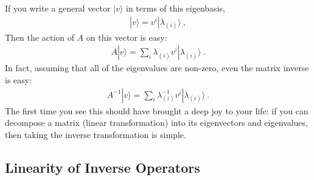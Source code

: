 If you write a general vector $|v\rangle$ in terms of this eigenbasis,
\begin{align}
  |v\rangle = v^i |\lambda_{(i)} \rangle \ ,
\end{align}
Then the action of $A$ on this vector is easy:
\begin{align}
  A |v\rangle = \sum_i \lambda_{(i)} v^i |\lambda_{(i)} \rangle \ .
\end{align}
In fact, assuming that all of the eigenvalues are non-zero, even the matrix inverse is easy:
\begin{align}
  A^{-1}|v\rangle = \sum_i \lambda_{(i)}^{-1} v^i |\lambda_{(i)} \rangle \ .
  \label{eq:linear:aglebra:inverse:eigenvectors}
\end{align}
The first time you see this should have brought a deep joy to your life: if you can decompose a matrix (linear transformation) into its eigenvectors and eigenvalues, then taking the inverse transformation is simple.


\subsection{Linearity of Inverse Operators}

